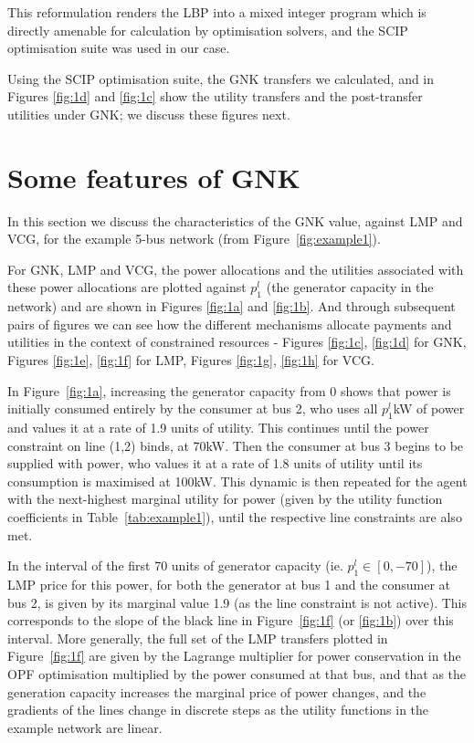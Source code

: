 This reformulation renders the LBP into a mixed integer program which is directly amenable for calculation by optimisation solvers, and the SCIP optimisation suite was used in our case.

Using the SCIP optimisation suite, the GNK transfers we calculated, and in Figures \ref{fig:1d} and \ref{fig:1c} show the utility transfers and the post-transfer utilities under GNK; we discuss these figures next.


\section{Some features of GNK}\label{sec:features}

In this section we discuss the characteristics of the GNK value, against LMP and VCG, for the example 5-bus network (from Figure~\ref{fig:example1}).

For GNK, LMP and VCG, the power allocations and the utilities associated with these power allocations are plotted against $p_1^l$ (the generator capacity in the network) and are shown in Figures \ref{fig:1a} and \ref{fig:1b}.
And through subsequent pairs of figures we can see how the different mechanisms allocate payments and utilities in the context of constrained resources - Figures \ref{fig:1c}, \ref{fig:1d} for GNK, Figures \ref{fig:1e}, \ref{fig:1f} for LMP, Figures \ref{fig:1g}, \ref{fig:1h} for VCG.

\iffigures
% 

\fi

In Figure~\ref{fig:1a}, increasing the generator capacity from $0$ shows that power is initially consumed entirely by the consumer at bus 2, 
who uses all $p_1^l$kW of power and values it at a rate of 1.9 units of utility. This continues until the power constraint on line (1,2) binds, at 70kW.
Then the consumer at bus 3 begins to be supplied with power, who values it at a rate of 1.8 units of utility until its consumption is maximised at 100kW. 
This dynamic is then repeated for the agent with the next-highest marginal utility for power (given by the utility function coefficients in Table~\ref{tab:example1}), until the respective line constraints are also met.

In the interval of the first 70 units of generator capacity (ie. $p_1^l \in [0,-70]$), the LMP price for this power, for both the generator at bus 1 and the consumer at bus 2, is given by its marginal value 1.9 (as the line constraint is not active). This corresponds to the slope of the black line in Figure~\ref{fig:1f} (or \ref{fig:1b}) over this interval. 
More generally, the full set of the LMP transfers plotted in Figure~\ref{fig:1f} are given by the Lagrange multiplier for power conservation in the OPF optimisation multiplied by the power consumed at that bus, and that as the generation capacity increases the marginal price of power changes, and the gradients of the lines change in discrete steps as the utility functions in the example network are linear.

